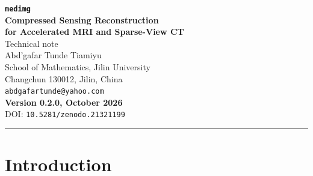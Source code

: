 \documentclass[11pt,a4paper]{article}
\newcommand{\seprule}{\vspace{4pt}\noindent\rule{\textwidth}{0.5pt}\vspace{4pt}}
\newcommand{\code}[1]{\texttt{#1}}
\begin{document}
\begin{center}
{\LARGE\bfseries\texttt{medimg}}\\[6pt]
{\Large\bfseries Compressed Sensing Reconstruction\\[2pt]
 for Accelerated MRI and Sparse-View CT}\\[10pt]
{\large Technical note}\\[10pt]
{\large Abd'gafar Tunde Tiamiyu}\\[4pt]
{\small School of Mathematics, Jilin University\\[2pt]
 Changchun 130012, Jilin, China}\\[4pt]
{\small\texttt{abdgafartunde@yahoo.com}}\\[12pt]
{\small\bfseries Version 0.2.0, October 2026}\\[4pt]
{\small DOI: \texttt{10.5281/zenodo.21321199}}\\[4pt]
\seprule
\end{center}

\renewcommand{\abstractname}{Summary}
\begin{abstract}
\noindent
\texttt{medimg} is an open-source Python package for image reconstruction
from undersampled data in two settings: accelerated magnetic resonance
imaging (MRI), where part of k-space is sampled, and sparse-view computed
tomography (CT), where few projection angles are measured. It provides the
forward operators and their exact adjoints, both normalized to unit norm, and
three reconstruction methods behind one interface: Tikhonov regularization
(conjugate gradients), total variation (Chambolle--Pock), and wavelet
compressed sensing (FISTA). This note documents the operators and algorithms
as implemented, reports the verification results (dot-product tests,
operator norms, orthogonality of the wavelet transform, golden-output tests)
and the reconstruction results on test images, gives guidance on choosing
the noise model and the regularization parameters, and states the
limitations. A step-by-step tutorial is provided separately as
\code{examples/00\_getting\_started.ipynb}.
\end{abstract}

\tableofcontents

\section{Introduction}
\end{document}
